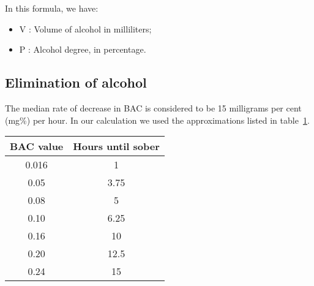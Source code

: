 In this formula, we have:

\begin{itemize}
\item V : Volume of alcohol in milliliters;
\item P : Alcohol degree, in percentage.
\end{itemize}

\subsection{Elimination of alcohol}
\label{ssec:elim}

The median rate of decrease in BAC is considered to be 15 milligrams per cent (mg\%) per hour. In our calculation we used the approximations listed in {\sc table}~\ref{tab:elim}.

\begin{table}[H]
\centering
\begin{tabular}{|c|c|}
  \hline
  \bf{BAC value} & \bf{Hours until sober}\\
  \hline
	0.016 & 1\\
	0.05 & 3.75\\
	0.08 & 5\\
	0.10 & 6.25\\
	0.16 & 10\\
	0.20 & 12.5\\
	0.24 & 15\\
  \hline
\end{tabular}
\label{tab:elim}
\end{table}